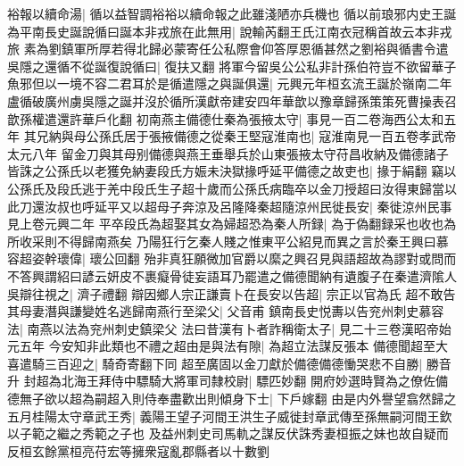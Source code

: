 裕報以續命湯|{
	循以益智調裕裕以續命報之此雖淺陋亦兵機也}
循以前琅邪内史王誕為平南長史誕說循曰誕本非戎旅在此無用|{
	說輸芮翻王氏江南衣冠稱首故云本非戎旅}
素為劉鎮軍所厚若得北歸必蒙寄任公私際會仰答厚恩循甚然之劉裕與循書令遣吳隱之還循不從誕復說循曰|{
	復扶又翻}
將軍今留吳公公私非計孫伯符豈不欲留華子魚邪但以一境不容二君耳於是循遣隱之與誕俱還|{
	元興元年桓玄流王誕於嶺南二年盧循破廣州虜吳隱之誕并沒於循所漢獻帝建安四年華歆以豫章歸孫策策死曹操表召歆孫權遣還許華戶化翻}
初南燕主備德仕秦為張掖太守|{
	事見一百二卷海西公太和五年}
其兄納與母公孫氏居于張掖備德之從秦王堅寇淮南也|{
	寇淮南見一百五卷孝武帝太元八年}
留金刀與其母别備德與燕王垂舉兵於山東張掖太守苻昌收納及備德諸子皆誅之公孫氏以老獲免納妻段氏方娠未決獄掾呼延平備德之故吏也|{
	掾于絹翻}
竊以公孫氏及段氏逃于羌中段氏生子超十歲而公孫氏病臨卒以金刀授超曰汝得東歸當以此刀還汝叔也呼延平又以超母子奔涼及呂隆降秦超隨涼州民徙長安|{
	秦徙涼州民事見上卷元興二年}
平卒段氏為超娶其女為婦超恐為秦人所録|{
	為于偽翻録采也收也為所收采則不得歸南燕矣}
乃陽狂行乞秦人賤之惟東平公紹見而異之言於秦王興曰慕容超姿幹瓌偉|{
	瓌公回翻}
殆非真狂願微加官爵以縻之興召見與語超故為謬對或問而不答興謂紹曰諺云妍皮不裹癡骨徒妄語耳乃罷遣之備德聞納有遺腹子在秦遣濟隂人吳辯往視之|{
	濟子禮翻}
辯因鄉人宗正謙賣卜在長安以告超|{
	宗正以官為氏}
超不敢告其母妻潛與謙變姓名逃歸南燕行至梁父|{
	父音甫}
鎮南長史悦夀以告兖州刺史慕容法|{
	南燕以法為兖州刺史鎮梁父}
法曰昔漢有卜者詐稱衛太子|{
	見二十三卷漢昭帝始元五年}
今安知非此類也不禮之超由是與法有隙|{
	為超立法謀反張本}
備德聞超至大喜遣騎三百迎之|{
	騎奇寄翻下同}
超至廣固以金刀獻於備德備德慟哭悲不自勝|{
	勝音升}
封超為北海王拜侍中驃騎大將軍司隸校尉|{
	驃匹妙翻}
開府妙選時賢為之僚佐備德無子欲以超為嗣超入則侍奉盡歡出則傾身下士|{
	下戶嫁翻}
由是内外譽望翕然歸之　五月桂陽太守章武王秀|{
	義陽王望子河間王洪生子威徙封章武傳至孫無嗣河間王欽以子範之繼之秀範之子也}
及益州刺史司馬軌之謀反伏誅秀妻桓振之妹也故自疑而反桓玄餘黨桓亮苻宏等擁衆寇亂郡縣者以十數劉

